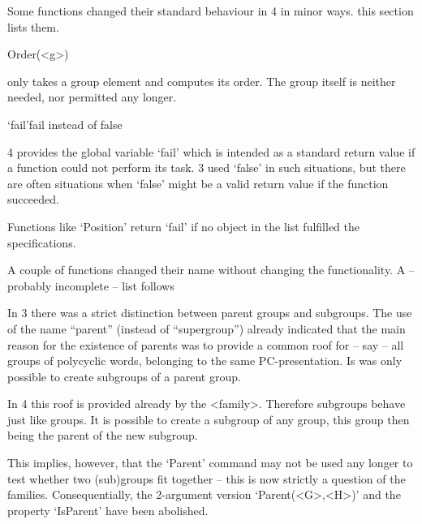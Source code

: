 Some functions changed their standard behaviour in {\GAP}4 in minor ways.
this section lists them.

\>Order(<g>)

only takes a group element and computes its order. The group itself is
neither needed, nor permitted any longer.

\>`fail'{fail instead of false}

{\GAP}4 provides the global variable `fail' which is intended as a standard
return value if a function could not perform its task. {\GAP}3 used `false'
in such situations, but there are often situations when `false' might be a
valid return value if the function succeeded.

Functions like `Position' return `fail' if no object in the list fulfilled
the specifications.


A couple of functions changed their name without changing the
functionality. A -- probably incomplete -- list follows


In {\GAP}3 there was a strict distinction between parent groups and
subgroups.
The use of the name ``parent''
(instead of ``supergroup'') already indicated that the main reason for the
existence of parents was to provide
a common roof for -- say -- all groups of polycyclic words, belonging to the
same PC-presentation. Is was only possible to create subgroups of
a parent group.

In {\GAP}4 this roof is provided already by the <family>. Therefore
subgroups behave just like groups. It is possible to create a subgroup of
any group, this group then being the parent of the new subgroup.

This implies, however, that the `Parent' command may not be used any longer
to test whether two (sub)groups fit together -- this is now strictly a
question of the families. Consequentially, the 2-argument version
`Parent(<G>,<H>)' and the property `IsParent' have been abolished.

